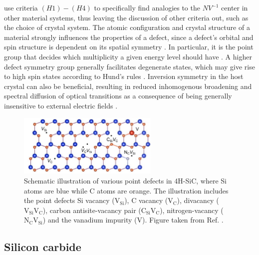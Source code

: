 
\citeauthor{Weber2010} \cite{Weber2010} use criteria $(H1)-(H4)$ to specifically find analogies to the $NV^{-1}$ center in other material systems, thus leaving the discussion of other criteria out, such as the choice of crystal system. The atomic configuration and crystal structure of a material strongly influences the properties of a defect, since a defect's orbital and spin structure is dependent on its spatial symmetry \cite{Bassett2019}. In particular, it is the point group that decides which multiplicity a given energy level should have \cite{James1976}. A higher defect symmetry group generally facilitates degenerate states, which may give rise to high spin states according to Hund's rules \cite{Bassett2019, Togan2010}. Inversion symmetry in the host crystal can also be beneficial, resulting in reduced inhomogenous broadening and spectral diffusion of optical transitions as a consequence of being generally insensitive to external electric fields \cite{Bassett2019}.

\begin{figure}
  \centering
  \includegraphics[width=0.6\textwidth]{theory/figures/4H-SiC.png}
  \caption{Schematic illustration of various point defects in 4H-SiC, where Si atoms are blue while C atoms are orange. The illustration includes the point defects Si vacancy ($\text{V}_{\text{Si}}$), C vacancy ($\text{V}_{\text{C}}$), divacancy ($\text{V}_{\text{Si}}\text{V}_{\text{C}}$), carbon antisite-vacancy pair ($\text{C}_{\text{Si}}\text{V}_{\text{C}}$), nitrogen-vacancy ($\text{N}_{\text{C}}\text{V}_{\text{Si}}$) and the vanadium impurity ($\text{V}$). Figure taken from Ref. \cite{Bathen2020}.}
  \label{fig:4H-SiC}
\end{figure}

\subsection{Silicon carbide}
\label{silicon-carbide}

